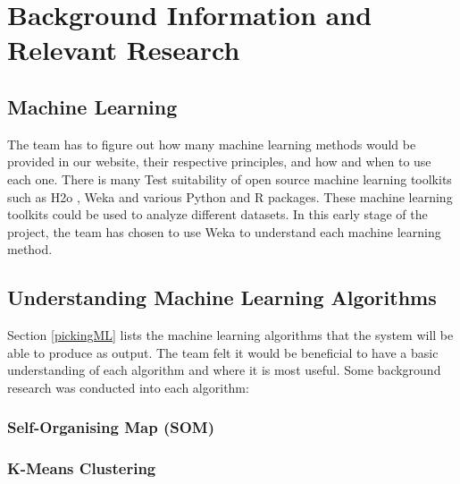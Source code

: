 \documentclass[titlepage]{article}
\begin{document}
\section{Background Information and \\Relevant Research}
\subsection{Machine Learning}
The team has to figure out how many machine learning methods would be provided in our website, their respective principles, and how and when to use each one.
There is many Test suitability of open source machine learning toolkits such as H2o \cite{h2o.ai}, Weka \cite{weka} and various Python and R packages. These machine learning toolkits could be used to analyze different datasets. In this early stage of the project, the team has chosen to use Weka to understand each machine learning method.

\subsection{Understanding Machine Learning Algorithms}
Section \ref{pickingML} lists the machine learning algorithms that the system will be able to produce as output. The team felt it would be beneficial to have a basic understanding of each algorithm and where it is most useful. Some background research was conducted into each algorithm:

\subsubsection*{Self-Organising Map (SOM)}
\subsubsection*{K-Means Clustering}
\end{document}
